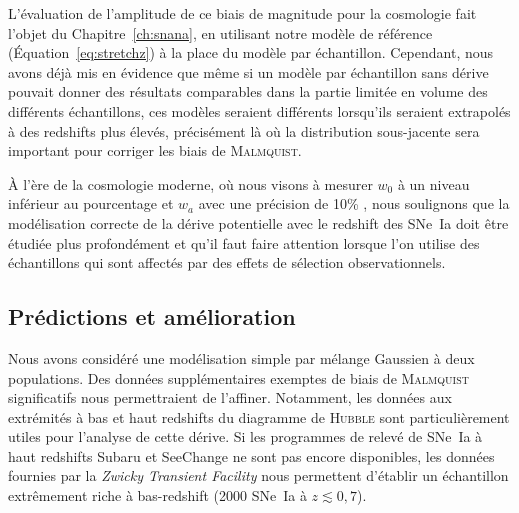 \documentclass[../main/main.tex]{subfiles}
\begin{document}
L'évaluation de l'amplitude de ce biais de magnitude pour la cosmologie fait
l'objet du Chapitre~\ref{ch:snana}, en utilisant notre modèle de référence
(Équation~\ref{eq:stretchz}) à la place du modèle par échantillon. Cependant,
nous avons déjà mis en évidence que même si un modèle par échantillon sans
dérive pouvait donner des résultats comparables dans la partie limitée en volume
des différents échantillons, ces modèles seraient différents lorsqu'ils
seraient extrapolés à des redshifts plus élevés, précisément là où la
distribution sous-jacente sera important pour corriger les biais de
\textsc{Malmquist}.

À l'ère de la cosmologie moderne, où nous visons à mesurer $w_0$ à un niveau
inférieur au pourcentage et $w_a$ avec une précision de 10\% \citep[par
exemple,][]{ivezic2019}, nous soulignons que la modélisation correcte de la
dérive potentielle avec le redshift des SNe~Ia doit être étudiée plus
profondément et qu'il faut faire attention lorsque l'on utilise des échantillons
qui sont affectés par des effets de sélection observationnels.

\subsection{Prédictions et amélioration}\label{ssec:xpred}

Nous avons considéré une modélisation simple par mélange Gaussien à deux
populations. Des données supplémentaires exemptes de biais de \textsc{Malmquist}
significatifs nous permettraient de l'affiner. Notamment, les données aux
extrémités à bas et haut redshifts du diagramme de \textsc{Hubble} sont
particulièrement utiles pour l'analyse de cette dérive. Si les programmes de
relevé de SNe~Ia à haut redshifts Subaru et SeeChange ne sont pas encore
disponibles, les données fournies par la \textit{Zwicky Transient Facility}
\citep[ZTF,][]{bellm2019, graham2019} nous permettent d'établir un échantillon
extrêmement riche à bas-redshift (2000 SNe~Ia à $z \lesssim 0,7$).

\newpage

\minilof
\minilot

% 
% 
\end{document}
